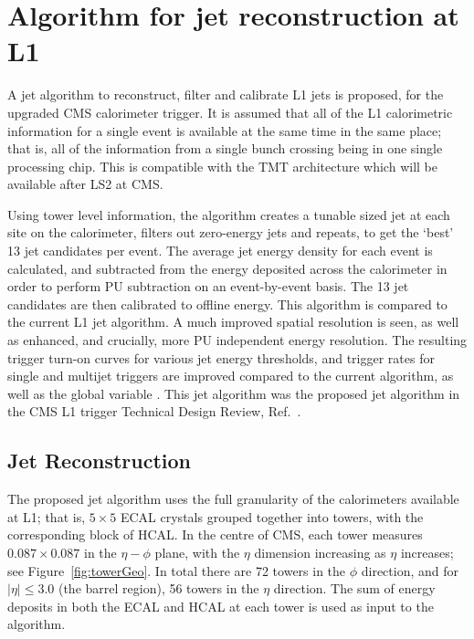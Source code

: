 \section{Algorithm for jet reconstruction at L1}
\label{Sec:Algo}
A jet algorithm to reconstruct, filter and calibrate \ac{L1} jets is proposed, for the upgraded \ac{CMS} calorimeter trigger.
It is assumed that all of the \ac{L1} calorimetric information for a single event is available at 
the same time in the same place; that is, all of the information from a single bunch crossing being in one single processing chip.
This is compatible with the \ac{TMT} architecture which will be available after LS2 at \ac{CMS}. 

Using tower level information, the algorithm creates a tunable sized jet at each site on the calorimeter, filters out zero-energy jets and repeats, to get the `best' 13 jet candidates per event. The average jet energy density for each event is calculated, and subtracted from the energy deposited across the calorimeter in order to perform \ac{PU} subtraction on an event-by-event basis. 
The 13 jet candidates are then calibrated to offline energy. 
This algorithm is compared to the current L1 jet algorithm.%
A much improved spatial resolution is seen, as well as enhanced, and crucially, more \ac{PU} independent energy resolution. 
The resulting trigger turn-on curves for various jet energy thresholds, and trigger rates for single and multijet triggers are improved compared to the current algorithm, as well as the global variable \HT.
This jet algorithm was the proposed jet algorithm in the \ac{CMS} \ac{L1} trigger Technical Design Review, Ref.~\cite{Tapper:1556311}.


\subsection{Jet Reconstruction}

The proposed jet algorithm uses the full granularity of the calorimeters available at \ac{L1}; that is, $5 \times 5$ \ac{ECAL} crystals grouped together into towers, with the corresponding block of \ac{HCAL}. 
In the centre of \ac{CMS}, each tower measures $0.087\times0.087$ in the $\eta-\phi$ plane, with the $\eta$ dimension increasing as $\eta$ increases; see Figure~\ref{fig:towerGeo}. 
In total there are 72 towers in the $\phi$ direction, and for $|\eta|\leq3.0$ (the barrel region), 56 towers in the $\eta$ direction.
The sum of energy deposits in both the \ac{ECAL} and \ac{HCAL} at each tower is used as input to the algorithm. 

